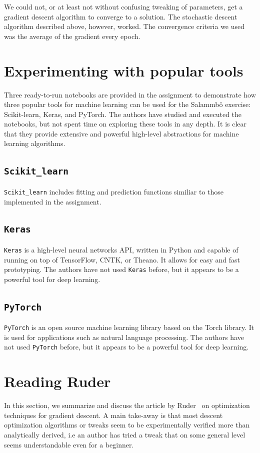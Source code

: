 \documentclass[a4paper]{article}
\begin{document}
We could not, or at least not without confusing tweaking of parameters, get a gradient descent algorithm to converge to a solution. The stochastic descent algorithm described above, however, worked. The convergence criteria we used was the average of the gradient every epoch.

\section{Experimenting with popular tools}
Three ready-to-run notebooks are provided in the assignment to demonstrate how three popular tools for machine learning can be used for the Salammbô exercise: Scikit-learn, Keras, and PyTorch. The authors have studied and executed the notebooks, but not spent time on exploring these tools in any depth. It is clear that they provide extensive and powerful high-level abstractions for machine learning algorithms.

\subsection{\texttt{Scikit\_learn}}
\texttt{Scikit\_learn} includes fitting and prediction functions similiar to those implemented in the assignment. 

\subsection{\texttt{Keras}}
\texttt{Keras} is a high-level neural networks API, written in Python and capable of running on top of TensorFlow, CNTK, or Theano. It allows for easy and fast prototyping. The authors have not used \texttt{Keras} before, but it appears to be a powerful tool for deep learning.

\subsection{\texttt{PyTorch}}
\texttt{PyTorch} is an open source machine learning library based on the Torch library. It is used for applications such as natural language processing. The authors have not used \texttt{PyTorch} before, but it appears to be a powerful tool for deep learning.



\section{Reading Ruder}

In this section, we summarize and discuss the article by Ruder~\cite{ruder_overview_2016} on optimization techniques for gradient descent.
A main take-away is that most descent optimization algorithms or tweaks seem to be experimentally verified more than analytically derived, i.e an author has tried a tweak that on some general level seems understandable even for a beginner.
\end{document}
